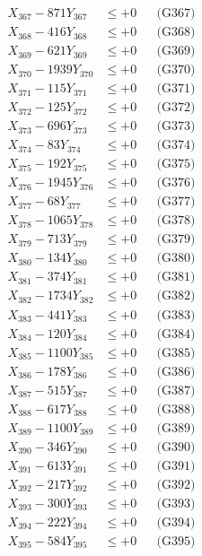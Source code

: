 \documentclass[a4paper,10pt]{article}
\begin{document}
{\begin{align}
X_{367} - 871Y_{367} &\leq +0 && \text{(G367)} \\
X_{368} - 416Y_{368} &\leq +0 && \text{(G368)} \\
X_{369} - 621Y_{369} &\leq +0 && \text{(G369)} \\
X_{370} - 1939Y_{370} &\leq +0 && \text{(G370)} \\
\allowbreak
X_{371} - 115Y_{371} &\leq +0 && \text{(G371)} \\
X_{372} - 125Y_{372} &\leq +0 && \text{(G372)} \\
X_{373} - 696Y_{373} &\leq +0 && \text{(G373)} \\
X_{374} - 83Y_{374} &\leq +0 && \text{(G374)} \\
X_{375} - 192Y_{375} &\leq +0 && \text{(G375)} \\
X_{376} - 1945Y_{376} &\leq +0 && \text{(G376)} \\
X_{377} - 68Y_{377} &\leq +0 && \text{(G377)} \\
X_{378} - 1065Y_{378} &\leq +0 && \text{(G378)} \\
X_{379} - 713Y_{379} &\leq +0 && \text{(G379)} \\
X_{380} - 134Y_{380} &\leq +0 && \text{(G380)} \\
\allowbreak
X_{381} - 374Y_{381} &\leq +0 && \text{(G381)} \\
X_{382} - 1734Y_{382} &\leq +0 && \text{(G382)} \\
X_{383} - 441Y_{383} &\leq +0 && \text{(G383)} \\
X_{384} - 120Y_{384} &\leq +0 && \text{(G384)} \\
X_{385} - 1100Y_{385} &\leq +0 && \text{(G385)} \\
X_{386} - 178Y_{386} &\leq +0 && \text{(G386)} \\
X_{387} - 515Y_{387} &\leq +0 && \text{(G387)} \\
X_{388} - 617Y_{388} &\leq +0 && \text{(G388)} \\
X_{389} - 1100Y_{389} &\leq +0 && \text{(G389)} \\
X_{390} - 346Y_{390} &\leq +0 && \text{(G390)} \\
\allowbreak
X_{391} - 613Y_{391} &\leq +0 && \text{(G391)} \\
X_{392} - 217Y_{392} &\leq +0 && \text{(G392)} \\
X_{393} - 300Y_{393} &\leq +0 && \text{(G393)} \\
X_{394} - 222Y_{394} &\leq +0 && \text{(G394)} \\
X_{395} - 584Y_{395} &\leq +0 && \text{(G395)} \\

\end{align}}
\end{document}
